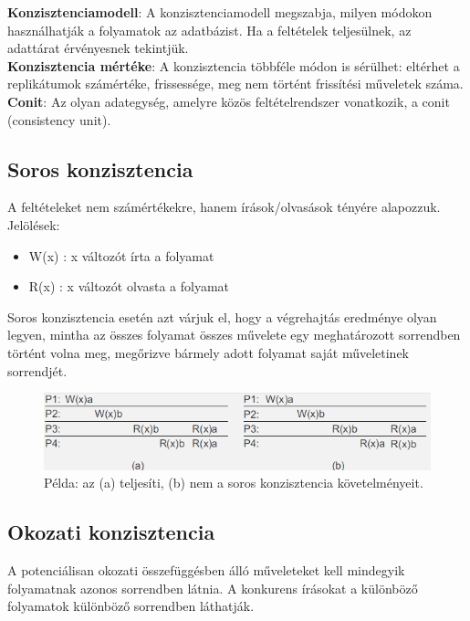 \documentclass[margin=0px]{article}
\begin{document}
\noindent \textbf{Konzisztenciamodell}: A konzisztenciamodell megszabja, milyen módokon használhatják a folyamatok
az adatbázist. Ha a feltételek teljesülnek, az adattárat érvényesnek tekintjük.\\

\noindent \textbf{Konzisztencia mértéke}: A konzisztencia többféle módon is sérülhet: eltérhet a replikátumok
számértéke, frissessége, meg nem történt frissítési műveletek száma.\\

\noindent \textbf{Conit}: Az olyan adategység, amelyre közös feltételrendszer vonatkozik, a conit (consistency unit).

\subsection{Soros konzisztencia}

A feltételeket nem számértékekre, hanem írások/olvasások tényére alapozzuk.
Jelölések:
\begin{itemize}
    \item	W(x) : x változót írta a folyamat
    \item	R(x) : x változót olvasta a folyamat
\end{itemize}

Soros konzisztencia esetén azt várjuk el, hogy a végrehajtás eredménye olyan legyen, mintha az összes folyamat
összes művelete egy meghatározott sorrendben történt volna meg, megőrizve bármely adott folyamat saját műveletinek
sorrendjét.

\begin{figure}[H]
    \centering
    \includegraphics[width=0.7\linewidth]{img/konz_soros}
    \caption{Példa: az (a) teljesíti, (b) nem a soros konzisztencia követelményeit.}
    \label{fig:konz_soros}
\end{figure}

\subsection{Okozati konzisztencia}

A potenciálisan okozati összefüggésben álló műveleteket kell mindegyik folyamatnak azonos sorrendben látnia.
A konkurens írásokat a különböző folyamatok különböző sorrendben láthatják.
\end{document}
